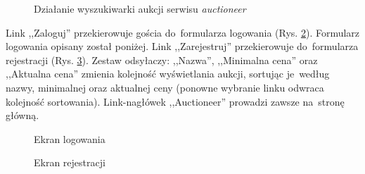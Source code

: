 \begin{figure}[h]
\centering
{}
\caption{Działanie wyszukiwarki aukcji serwisu \textit{auctioneer}}
\label{screen02}
\end{figure}

Link ,,Zaloguj'' przekierowuje gościa do~formularza logowania (Rys. \ref{screen03}). Formularz logowania opisany został poniżej. Link ,,Zarejestruj'' przekierowuje do~formularza rejestracji (Rys. \ref{screen13}). Zestaw odsyłaczy: ,,Nazwa'', ,,Minimalna cena'' oraz ,,Aktualna cena''  zmienia kolejność wyświetlania aukcji, sortując je~według nazwy, minimalnej oraz aktualnej ceny (ponowne wybranie linku odwraca kolejność sortowania). Link-nagłówek ,,Auctioneer'' prowadzi zawsze na~stronę główną.

\begin{figure}[h]
\centering
{}
\caption{Ekran logowania}
\label{screen03}
\end{figure}

\begin{figure}[h]
\centering
{}
\caption{Ekran rejestracji}
\label{screen13}
\end{figure}

